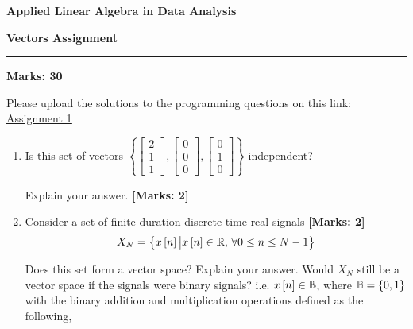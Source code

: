 \documentclass[12pt]{article}
\def\mb{\ensuremath\mathbb}
\def\lc{\ensuremath\left\{}
\def\rc{\ensuremath\right\}}
\def\ls{\ensuremath\left[}
\def\rs{\ensuremath\right]}
\newcommand{\dt}[1]{\ls #1\rs}
\begin{document}
\begin{center}
\begin{large}
\textbf{Applied Linear Algebra in Data Analysis}\\
\vspace{0.1cm}
\end{large}
\textbf{Vectors Assignment}
\end{center}
\hrule
\vspace{1em}

\begin{large}
    \textbf{Marks: 30}
\end{large}

Please upload the solutions to the programming questions on this link: \href{https://forms.gle/bZWAFWjm9yRcwkEa9}{\underline{Assignment 1}}

\begin{enumerate}
    \item Is this set of vectors $\left\{\begin{bmatrix}2 \\ 1 \\ 1\end{bmatrix}, \begin{bmatrix}0 \\ 0\\ 0\end{bmatrix}, \begin{bmatrix}0 \\ 1 \\ 0\end{bmatrix}\right\}$ independent? 
    
    Explain your answer. \textbf{[Marks: 2]}

    \item Consider a set of finite duration discrete-time real signals \textbf{[Marks: 2]}
    \[ X_N = \lc x\dt{n} \big\vert x\dt{n} \in \mb{R}, \,\forall 0 \leq n \leq N-1\rc \]
    
    Does this set form a vector space? Explain your answer. Would $X_N$ still be a vector space if the signals were binary signals? i.e. $x\dt{n} \in \mb{B}$, where $\mb{B} = \lc 0, 1\rc$ with the binary addition and multiplication operations defined as the following,


\end{enumerate}
\end{document}
